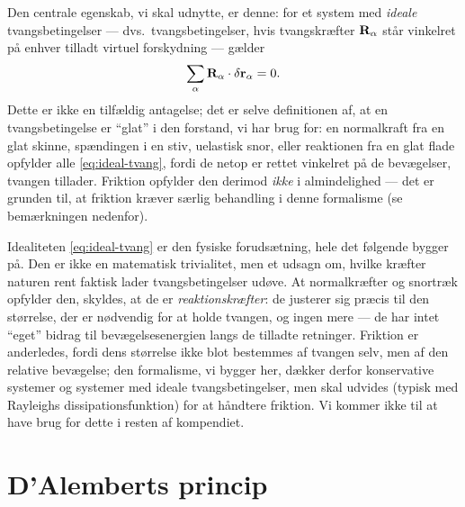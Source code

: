 Den centrale egenskab, vi skal udnytte, er denne: for et system med
\emph{ideale} tvangsbetingelser — dvs.\ tvangsbetingelser, hvis
tvangskræfter $\vb{R}_\alpha$ står vinkelret på enhver tilladt virtuel
forskydning — gælder
\begin{equation}
  \sum_\alpha \vb{R}_\alpha \cdot \delta\vb{r}_\alpha = 0.
  \label{eq:ideal-tvang}
\end{equation}
Dette er ikke en tilfældig antagelse; det er selve definitionen af, at
en tvangsbetingelse er ``glat'' i den forstand, vi har brug for: en
normalkraft fra en glat skinne, spændingen i en stiv, uelastisk snor,
eller reaktionen fra en glat flade opfylder alle \eqref{eq:ideal-tvang},
fordi de netop er rettet vinkelret på de bevægelser, tvangen tillader.
Friktion opfylder den derimod \emph{ikke} i almindelighed — det er
grunden til, at friktion kræver særlig behandling i denne formalisme
(se bemærkningen nedenfor).

\begin{bemaerkning}
Idealiteten \eqref{eq:ideal-tvang} er den fysiske forudsætning, hele
det følgende bygger på. Den er ikke en matematisk trivialitet, men et
udsagn om, hvilke kræfter naturen rent faktisk lader tvangsbetingelser
udøve. At normalkræfter og snortræk opfylder den, skyldes, at de er
\emph{reaktionskræfter}: de justerer sig præcis til den størrelse, der
er nødvendig for at holde tvangen, og ingen mere — de har intet ``eget''
bidrag til bevægelsesenergien langs de tilladte retninger. Friktion er
anderledes, fordi dens størrelse ikke blot bestemmes af tvangen selv,
men af den relative bevægelse; den formalisme, vi bygger her, dækker
derfor konservative systemer og systemer med ideale tvangsbetingelser,
men skal udvides (typisk med Rayleighs dissipationsfunktion) for at
håndtere friktion. Vi kommer ikke til at have brug for dette i resten
af kompendiet.
\end{bemaerkning}

\section{D'Alemberts princip}

